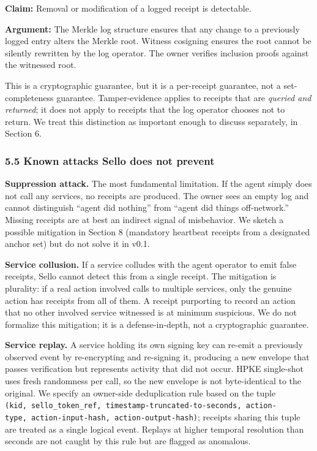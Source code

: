 \documentclass[
  11pt,
]{article}
\begin{document}
\textbf{Claim:} Removal or modification of a logged receipt is
detectable.

\textbf{Argument:} The Merkle log structure ensures that any change to a
previously logged entry alters the Merkle root. Witness cosigning
ensures the root cannot be silently rewritten by the log operator. The
owner verifies inclusion proofs against the witnessed root.

This is a cryptographic guarantee, but it is a per-receipt guarantee,
not a set-completeness guarantee. Tamper-evidence applies to receipts
that are \emph{queried and returned}; it does not apply to receipts that
the log operator chooses not to return. We treat this distinction as
important enough to discuss separately, in Section 6.

\hypertarget{known-attacks-sello-does-not-prevent}{%
\subsubsection{5.5 Known attacks Sello does not
prevent}\label{known-attacks-sello-does-not-prevent}}

\textbf{Suppression attack.} The most fundamental limitation. If the
agent simply does not call any services, no receipts are produced. The
owner sees an empty log and cannot distinguish ``agent did nothing''
from ``agent did things off-network.'' Missing receipts are at best an
indirect signal of misbehavior. We sketch a possible mitigation in
Section 8 (mandatory heartbeat receipts from a designated anchor set)
but do not solve it in v0.1.

\textbf{Service collusion.} If a service colludes with the agent
operator to emit false receipts, Sello cannot detect this from a single
receipt. The mitigation is plurality: if a real action involved calls to
multiple services, only the genuine action has receipts from all of
them. A receipt purporting to record an action that no other involved
service witnessed is at minimum suspicious. We do not formalize this
mitigation; it is a defense-in-depth, not a cryptographic guarantee.

\textbf{Service replay.} A service holding its own signing key can
re-emit a previously observed event by re-encrypting and re-signing it,
producing a new envelope that passes verification but represents
activity that did not occur. HPKE single-shot uses fresh randomness per
call, so the new envelope is not byte-identical to the original. We
specify an owner-side deduplication rule based on the tuple
\texttt{(kid,\ sello\_token\_ref,\ timestamp-truncated-to-seconds,\ action-type,\ action-input-hash,\ action-output-hash)};
receipts sharing this tuple are treated as a single logical event.
Replays at higher temporal resolution than seconds are not caught by
this rule but are flagged as anomalous.
\end{document}
